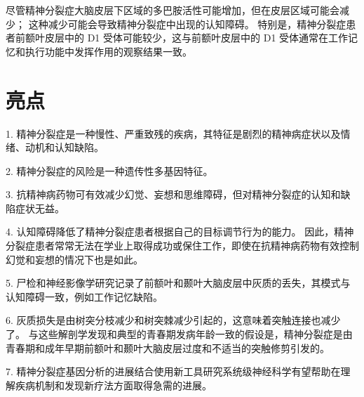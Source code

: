 尽管精神分裂症大脑皮层下区域的多巴胺活性可能增加，但在皮层区域可能会减少；
这种减少可能会导致精神分裂症中出现的认知障碍。
特别是，精神分裂症患者前额叶皮层中的 D1 受体可能较少，这与前额叶皮层中的 D1 受体通常在工作记忆和执行功能中发挥作用的观察结果一致。



\section{亮点}

1. 精神分裂症是一种慢性、严重致残的疾病，其特征是剧烈的精神病症状以及情绪、动机和认知缺陷。


2. 精神分裂症的风险是一种遗传性多基因特征。


3. 抗精神病药物可有效减少幻觉、妄想和思维障碍，但对精神分裂症的认知和缺陷症状无益。


4. 认知障碍降低了精神分裂症患者根据自己的目标调节行为的能力。
因此，精神分裂症患者常常无法在学业上取得成功或保住工作，即使在抗精神病药物有效控制幻觉和妄想的情况下也是如此。


5. 尸检和神经影像学研究记录了前额叶和颞叶大脑皮层中灰质的丢失，其模式与认知障碍一致，例如工作记忆缺陷。


6. 灰质损失是由树突分枝减少和树突棘减少引起的，这意味着突触连接也减少了。
与这些解剖学发现和典型的青春期发病年龄一致的假设是，精神分裂症是由青春期和成年早期前额叶和颞叶大脑皮层过度和不适当的突触修剪引发的。


7. 精神分裂症基因分析的进展结合使用新工具研究系统级神经科学有望帮助在理解疾病机制和发现新疗法方面取得急需的进展。



